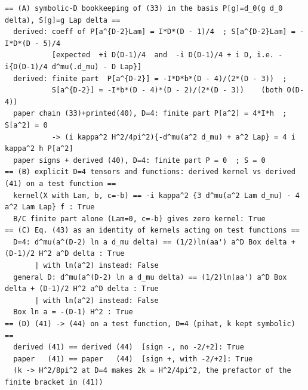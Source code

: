 \begin{verbatim}
== (A) symbolic-D bookkeeping of (33) in the basis P[g]=d_0(g d_0 delta), S[g]=g Lap delta ==
  derived: coeff of P[a^{D-2}Lam] = I*D*(D - 1)/4  ; S[a^{D-2}Lam] = -I*D*(D - 5)/4
           [expected  +i D(D-1)/4  and  -i D(D-1)/4 + i D, i.e. -i{D(D-1)/4 d^mu(.d_mu) - D Lap}]
  derived: finite part  P[a^{D-2}] = -I*D*b*(D - 4)/(2*(D - 3))  ;
           S[a^{D-2}] = -I*b*(D - 4)*(D - 2)/(2*(D - 3))    (both O(D-4))
  paper chain (33)+printed(40), D=4: finite part P[a^2] = 4*I*h  ; S[a^2] = 0
           -> (i kappa^2 H^2/4pi^2){-d^mu(a^2 d_mu) + a^2 Lap} = 4 i kappa^2 h P[a^2]
  paper signs + derived (40), D=4: finite part P = 0  ; S = 0
== (B) explicit D=4 tensors and functions: derived kernel vs derived (41) on a test function ==
  kernel(X with Lam, b, c=-b) == -i kappa^2 {3 d^mu(a^2 Lam d_mu) - 4 a^2 Lam Lap} f : True
  B/C finite part alone (Lam=0, c=-b) gives zero kernel: True
== (C) Eq. (43) as an identity of kernels acting on test functions ==
  D=4: d^mu(a^(D-2) ln a d_mu delta) == (1/2)ln(aa') a^D Box delta + (D-1)/2 H^2 a^D delta : True
       | with ln(a^2) instead: False
  general D: d^mu(a^(D-2) ln a d_mu delta) == (1/2)ln(aa') a^D Box delta + (D-1)/2 H^2 a^D delta : True
       | with ln(a^2) instead: False
  Box ln a = -(D-1) H^2 : True
== (D) (41) -> (44) on a test function, D=4 (pihat, k kept symbolic) ==
  derived (41) == derived (44)  [sign -, no -2/+2]: True
  paper   (41) == paper   (44)  [sign +, with -2/+2]: True
  (k -> H^2/8pi^2 at D=4 makes 2k = H^2/4pi^2, the prefactor of the finite bracket in (41))
\end{verbatim}
\endgroup

